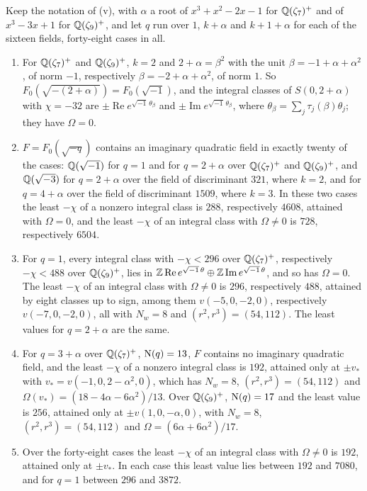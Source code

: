 \begin{proposition}
\label{prop:sexticweilmin}
Keep the notation of (v), with $\alpha$ a root of
$x^{3}+x^{2}-2x-1$ for $\mathbb{Q}(\zeta_{7})^{+}$ and of $x^{3}-3x+1$ for
$\mathbb{Q}(\zeta_{9})^{+}$, and let $q$ run over $1$, $k+\alpha$ and $k+1+\alpha$
for each of the sixteen fields, forty-eight cases in all.
\begin{enumerate}[label=\textup{(\roman*)},leftmargin=2.6em,itemsep=2pt]
\item For $\mathbb{Q}(\zeta_{7})^{+}$ and $\mathbb{Q}(\zeta_{9})^{+}$, $k=2$ and
  $2+\alpha=\beta^{2}$ with the unit $\beta=-1+\alpha+\alpha^{2}$, of norm
  $-1$, respectively $\beta=-2+\alpha+\alpha^{2}$, of norm $1$. So
  $F_{0}(\sqrt{-(2+\alpha)})=F_{0}(\sqrt{-1})$, and the integral classes of
  $S(0,2+\alpha)$ with $\chi=-32$ are $\pm\operatorname{Re}
  e^{\sqrt{-1}\,\theta_{\beta}}$ and $\pm\operatorname{Im}
  e^{\sqrt{-1}\,\theta_{\beta}}$, where
  $\theta_{\beta}=\sum_{j}\tau_{j}(\beta)\theta_{j}$; they have $\Omega=0$.
\item $F=F_{0}(\sqrt{-q})$ contains an imaginary quadratic field in exactly
  twenty of the cases: $\mathbb{Q}(\sqrt{-1})$ for $q=1$ and for $q=2+\alpha$ over
  $\mathbb{Q}(\zeta_{7})^{+}$ and $\mathbb{Q}(\zeta_{9})^{+}$, and $\mathbb{Q}(\sqrt{-3})$ for
  $q=2+\alpha$ over the field of discriminant $321$, where $k=2$, and for
  $q=4+\alpha$ over the field of discriminant $1509$, where $k=3$. In these
  two cases the least $-\chi$ of a nonzero integral class is $288$,
  respectively $4608$, attained with $\Omega=0$, and the least $-\chi$ of an
  integral class with $\Omega\ne0$ is $728$, respectively $6504$.
\item For $q=1$, every integral class with $-\chi<296$ over
  $\mathbb{Q}(\zeta_{7})^{+}$, respectively $-\chi<488$ over $\mathbb{Q}(\zeta_{9})^{+}$,
  lies in $\mathbb{Z}\operatorname{Re}e^{\sqrt{-1}\,\theta}
  \oplus\mathbb{Z}\operatorname{Im}e^{\sqrt{-1}\,\theta}$, and so has $\Omega=0$.
  The least $-\chi$ of an integral class with $\Omega\ne0$ is $296$,
  respectively $488$, attained by eight classes up to sign, among them
  $v(-5,0,-2,0)$, respectively $v(-7,0,-2,0)$, all with $N_{w}=8$ and
  $(r^{2},r^{3})=(54,112)$. The least values for $q=2+\alpha$ are the same.
\item For $q=3+\alpha$ over $\mathbb{Q}(\zeta_{7})^{+}$, $\mathrm{N}(q)=13$, $F$ contains
  no imaginary quadratic field, and the least $-\chi$ of a nonzero integral
  class is $192$, attained only at $\pm v_{*}$ with
  $v_{*}=v(-1,0,2-\alpha^{2},0)$, which has $N_{w}=8$,
  $(r^{2},r^{3})=(54,112)$ and $\Omega(v_{*})=(18-4\alpha-6\alpha^{2})/13$.
  Over $\mathbb{Q}(\zeta_{9})^{+}$, $\mathrm{N}(q)=17$ and the least value is $256$,
  attained only at $\pm v(1,0,-\alpha,0)$, with $N_{w}=8$,
  $(r^{2},r^{3})=(54,112)$ and $\Omega=(6\alpha+6\alpha^{2})/17$.
\item Over the forty-eight cases the least $-\chi$ of an integral class with
  $\Omega\ne0$ is $192$, attained only at $\pm v_{*}$. In each case this
  least value lies between $192$ and $7080$, and for $q=1$ between $296$ and
  $3872$.
\end{enumerate}
\end{proposition}

